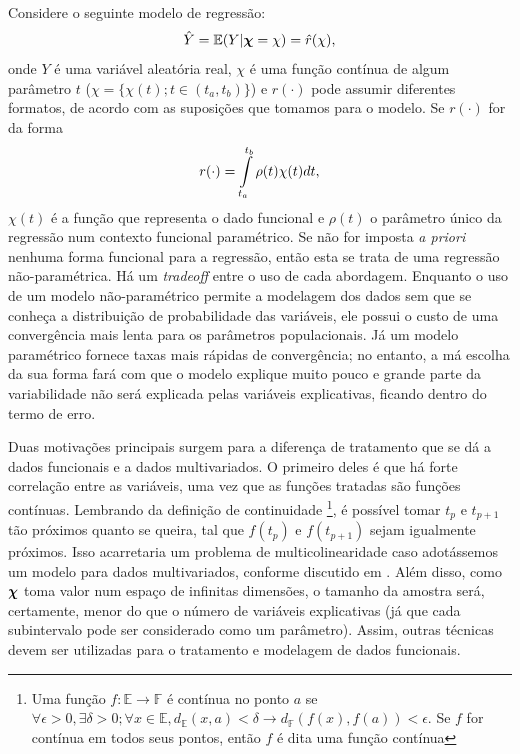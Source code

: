 \documentclass[
	12pt,				%
	openright,			%
	oneside,			%
	a4paper,			%
	english,			%
	brazil				%
	]{dissertacao-ufrgs-abntex2}
\begin{document}
Considere o seguinte modelo de regressão:
\begin{equation}
\hat{Y}= \mathbb{E} (Y|\boldsymbol{\chi}=\chi) =\hat{r}(\chi) ,\label{eq:modelo_regressao_basica}
\end{equation}
onde $Y$ é uma variável aleatória real, $\chi$ é uma função contínua
de algum parâmetro $t$ ($\chi=\{\chi(t);t\in(t_a,t_b)\}$) e $r(\cdot)$
pode assumir diferentes formatos, de acordo com as suposições que
tomamos para o modelo. Se $r(\cdot)$ for da forma
\begin{equation}
r(\cdot)=\intop_{t_a}^{t_b}\rho(t)\chi(t)dt,
\end{equation}
$\chi(t)$ é a função que representa o dado funcional e $\rho(t)$
o parâmetro único da regressão num contexto funcional paramétrico. Se não for imposta
\emph{a priori} nenhuma forma funcional para a regressão, então esta
se trata de uma regressão não-paramétrica.
Há um \emph{tradeoff} entre o uso de cada abordagem. Enquanto o uso de um
modelo não-paramétrico permite a modelagem dos dados sem que se conheça
a distribuição de probabilidade das variáveis, ele possui o custo
de uma convergência mais lenta para os parâmetros populacionais. Já
um modelo paramétrico fornece taxas mais rápidas de convergência;
no entanto, a má escolha da sua forma fará com que o modelo explique
muito pouco e grande parte da variabilidade não será explicada pelas
variáveis explicativas, ficando dentro do termo de erro.

Duas motivações principais surgem para a diferença de tratamento que se dá a dados
funcionais e a dados multivariados. O primeiro deles é que há forte
correlação entre as variáveis, uma vez que as funções tratadas são
funções contínuas. Lembrando da definição de continuidade%
\footnote{Uma função $f:\mathbb{E\rightarrow\mathbb{F}}$ é contínua no ponto
$a$ se $\forall\epsilon>0,\exists\delta>0;\forall x\in\mathbb{E},d_{\mathbb{E}}(x,a)<\delta\rightarrow d_{\mathbb{F}}(f(x),f(a))<\epsilon$.
Se $f$ for contínua em todos seus pontos, então $f$ é dita uma função
contínua%
}, é possível tomar $t_{p}$ e $t_{p+1}$ tão próximos quanto se queira,
tal que $f(t_{p})$ e $f(t_{p+1})$ sejam igualmente próximos. Isso
acarretaria um problema de multicolinearidade caso adotássemos um
modelo para dados multivariados, conforme discutido em . Além disso, como $\boldsymbol{\chi}$ toma valor num espaço de infinitas dimensões, o tamanho da amostra será, certamente, menor do que o número de variáveis explicativas (já que cada subintervalo pode ser considerado como um parâmetro). Assim, outras
técnicas devem ser utilizadas para o tratamento e modelagem de dados
funcionais.
\end{document}
